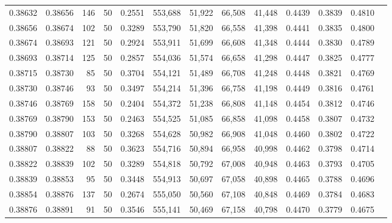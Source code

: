 \begin{tabular}{rrrrrrrrrrrrr}
0.38632 & 0.38656 &   146 &  50 &                                     0.2551 & 553,688 &  51,922 &  66,508 &  41,448 & 0.4439 & 0.3839 & 0.4810 \\
0.38656 & 0.38674 &   102 &  50 &                                     0.3289 & 553,790 &  51,820 &  66,558 &  41,398 & 0.4441 & 0.3835 & 0.4800 \\
0.38674 & 0.38693 &   121 &  50 &                                     0.2924 & 553,911 &  51,699 &  66,608 &  41,348 & 0.4444 & 0.3830 & 0.4789 \\
0.38693 & 0.38714 &   125 &  50 &                                     0.2857 & 554,036 &  51,574 &  66,658 &  41,298 & 0.4447 & 0.3825 & 0.4777 \\
0.38715 & 0.38730 &    85 &  50 &                                     0.3704 & 554,121 &  51,489 &  66,708 &  41,248 & 0.4448 & 0.3821 & 0.4769 \\
0.38730 & 0.38746 &    93 &  50 &                                     0.3497 & 554,214 &  51,396 &  66,758 &  41,198 & 0.4449 & 0.3816 & 0.4761 \\
0.38746 & 0.38769 &   158 &  50 &                                     0.2404 & 554,372 &  51,238 &  66,808 &  41,148 & 0.4454 & 0.3812 & 0.4746 \\
0.38769 & 0.38790 &   153 &  50 &                                     0.2463 & 554,525 &  51,085 &  66,858 &  41,098 & 0.4458 & 0.3807 & 0.4732 \\
0.38790 & 0.38807 &   103 &  50 &                                     0.3268 & 554,628 &  50,982 &  66,908 &  41,048 & 0.4460 & 0.3802 & 0.4722 \\
0.38807 & 0.38822 &    88 &  50 &                                     0.3623 & 554,716 &  50,894 &  66,958 &  40,998 & 0.4462 & 0.3798 & 0.4714 \\
0.38822 & 0.38839 &   102 &  50 &                                     0.3289 & 554,818 &  50,792 &  67,008 &  40,948 & 0.4463 & 0.3793 & 0.4705 \\
0.38839 & 0.38853 &    95 &  50 &                                     0.3448 & 554,913 &  50,697 &  67,058 &  40,898 & 0.4465 & 0.3788 & 0.4696 \\
0.38854 & 0.38876 &   137 &  50 &                                     0.2674 & 555,050 &  50,560 &  67,108 &  40,848 & 0.4469 & 0.3784 & 0.4683 \\
0.38876 & 0.38891 &    91 &  50 &                                     0.3546 & 555,141 &  50,469 &  67,158 &  40,798 & 0.4470 & 0.3779 & 0.4675 \\

\end{tabular}
